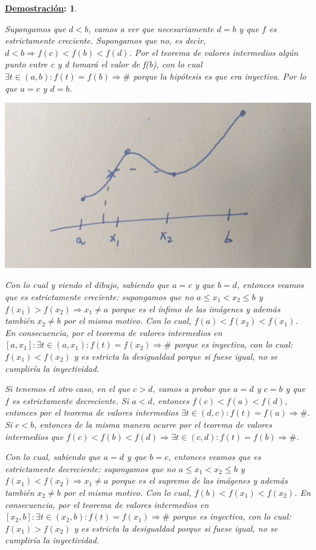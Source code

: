 \documentclass[10pt,a4paper,openright]{book}
\theoremstyle{break}
\newtheorem*{demo}{\underline{Demostración}:}
\begin{document}
\begin{demo}
\begin{enumerate}
\begin{itemize}
	Supongamos que $d<b$, vamos a ver que necesariamente $d=b$ y que $f$ es estrictamente creciente. Supongamos que no, es decir, $d<b\Rightarrow f(c)< f(b)< f(d)$. Por el teorema de valores intermedios algún punto entre c y d tomará el valor de f(b), con lo cual $\exists t\in (a,b): f(t)=f(b)\Rightarrow \#$ porque la hipótesis es que era inyectiva. Por lo que $a=c$ y $d=b$.
	
	\begin{center}
	\includegraphics[scale=0.25]{inyectividad a monotonia en continuas1}
	\end{center}
	
	Con lo cual y viendo el dibujo, sabiendo que $a=c$ y que $b=d$, entonces veamos que es estrictamente creciente: supongamos que no $a\leq x_1< x_2 \leq b$ y $f(x_1)>f(x_2)\Rightarrow x_1\neq a$ porque es el ínfimo de las imágenes y además también $x_2\neq b$ por el mismo motivo. Con lo cual, $f(a)< f(x_2)< f(x_1)$. En consecuencia, por el teorema de valores intermedios en $[a,x_1]: \exists t\in (a,x_1): f(t)=f(x_2)\Rightarrow \#$ porque es inyectiva, con lo cual: $f(x_1)<f(x_2)$ y es estricta la desigualdad porque si fuese igual, no se cumpliría la inyectividad.\par
		
	Si tenemos el otro caso, en el que $c>d$, vamos a probar que $a=d$ y $c=b$ y que $f$ es estrictamente decreciente. Si $a<d$, entonces $f(c)<f(a)<f(d)$, entonces por el teorema de valores intermedios $\exists t\in (d,c): f(t)=f(a)\Rightarrow \#$. Si $c<b$, entonces de la misma manera ocurre por el teorema de valores intermedios que $f(c)< f(b)< f(d)\Rightarrow \exists t\in (c,d): f(t)=f(b)\Rightarrow \#$.\par

Con lo cual, sabiendo que $a=d$ y que $b=c$, entonces veamos que es estrictamente decreciente: supongamos que no $a\leq x_1< x_2 \leq b$ y $f(x_1)<f(x_2)\Rightarrow x_1\neq a$ porque es el supremo de las imágenes y además también $x_2\neq b$ por el mismo motivo. Con lo cual, $f(b)< f(x_1)< f(x_2)$. En consecuencia, por el teorema de valores intermedios en $[x_2,b]: \exists t\in (x_2,b): f(t)=f(x_1)\Rightarrow \#$ porque es inyectiva, con lo cual: $f(x_1)>f(x_2)$ y es estricta la desigualdad porque si fuese igual, no se cumpliría la inyectividad.\par
	\end{itemize}
	

\end{enumerate}
\end{demo}
\end{document}
